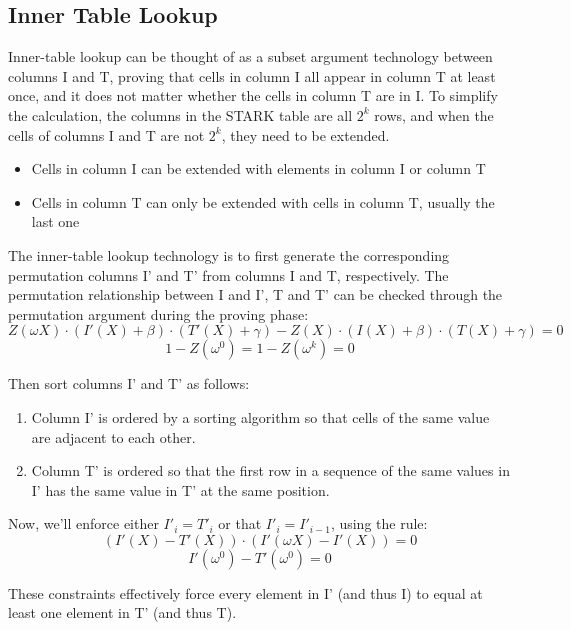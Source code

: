 \subsection{Inner Table Lookup}\label{section: inner-table-lookup}

Inner-table lookup can be thought of as a subset argument technology between columns I and T, proving that cells in column I all appear in column T at least once, and it does not matter whether the cells in column T are in I. To simplify the calculation, the columns in the STARK table are all $2^k$ rows, and when the cells of columns I and T are not $2^k$, they need to be extended.

\begin{itemize}
    \item Cells in column I can be extended with elements in column I or column T
    \item Cells in column T can only be extended with cells in column T, usually the last one
\end{itemize}

The inner-table lookup technology is to first generate the corresponding permutation columns I' and T' from columns I and T, respectively. The permutation relationship between I and I', T and T' can be checked through the permutation argument during the proving phase:
$$Z(\omega X) \cdot (I'(X) + \beta) \cdot (T'(X) + \gamma) - Z(X) \cdot (I(X) + \beta) \cdot (T(X) + \gamma) = 0$$
$$1 - Z(\omega^0) = 1 - Z(\omega^{k}) = 0$$

\noindent Then sort columns I' and T' as follows:

\begin{enumerate}
    \item Column I' is ordered by a sorting algorithm so that cells of the same value are adjacent to each other.
    \item Column T' is ordered so that the first row in a sequence of the same values in I' has the same value in T' at the same position.
\end{enumerate}

\noindent Now, we'll enforce either $I'_{i} = T'_{i}$ or that $I'_{i}=I'_{i-1}$, using the rule:
$$(I'(X) - T'(X)) \cdot (I'(\omega X) - I'(X)) = 0$$
$$I'(\omega^0) - T'(\omega^0) = 0$$

These constraints effectively force every element in I' (and thus I) to equal at least one element in T' (and thus T).